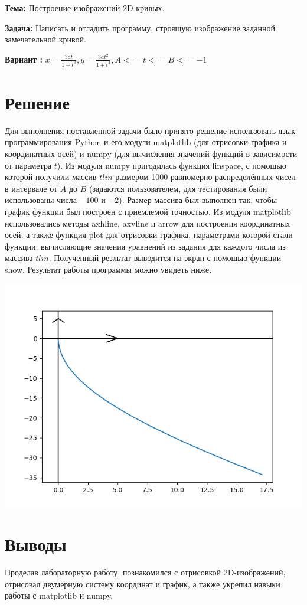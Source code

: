 \documentclass[12pt, a4paper]{article}
\begin{document}
    \par\textbf{Тема: } {
        Построение изображений 2D-кривых.
    }

    \par\textbf{Задача: } {
        Написать и отладить программу, строящую изображение заданной 
        замечательной кривой.
    }

    \par\textbf{Вариант : }
    $x=\frac{3at}{1+t^3}, 
    y=\frac{3at^2}{1+t^3}, A<=t<=B<=-1$
    
    \section{Решение}
    Для выполнения поставленной задачи было принято решение использовать язык 
    программирования Python и его модули matplotlib (для отрисовки графика и 
    координатных осей) и numpy (для вычисления значений функций в зависимости 
    от параметра $t$). Из модуля numpy пригодилась функция linspace, с помощью
    которой получили массив $tlin$ размером 1000 равномерно распределённых 
    чисел в интервале от $A$ до $B$ (задаются пользователем, для тестирования 
    были использованы числа $-100$ и $-2$). Размер массива был выполнен так, 
    чтобы график функции был построен с приемлемой точностью. Из модуля 
    matplotlib использовались методы axhline, axvline и arrow для построения 
    координатных осей, а также функция plot для отрисовки графика, параметрами 
    которой стали функции, вычисляющие значения уравнений из задания для 
    каждого числа из массива $tlin$. Полученный резльтат выводится на экран с 
    помощью функции show. Результат работы программы можно увидеть ниже.
    
    \includegraphics[scale=0.75]{Figure_1.png}
    
    \pagebreak
    
    \section{Выводы}
    Проделав лабораторную работу, познакомился с отрисовкой 2D-изображений, 
    отрисовал двумерную систему координат и график, а также укрепил навыки 
    работы с matplotlib и numpy.
\end{document}

